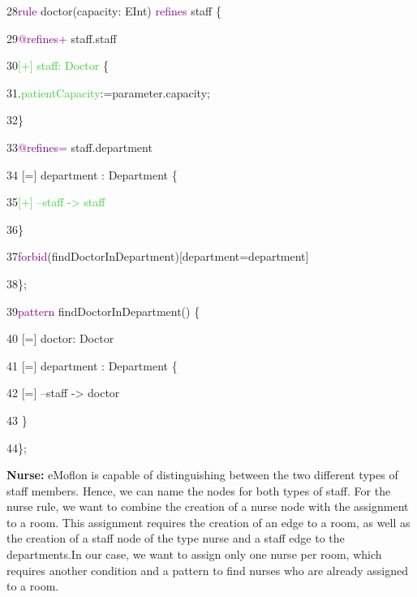 {

28\hspace{0.5cm}\textcolor{Purple}{rule} doctor(capacity: EInt) \textcolor{Purple}{refines} staff \{ 

29\hspace{1cm}\textcolor{Purple}{@refines+} staff.staff

30\hspace{1cm}\textcolor{LimeGreen}{[+] staff: Doctor} \{

31\hspace{1.5cm}.\textcolor{LimeGreen}{patientCapacity}:=parameter.capacity;

32\hspace{1cm}\}

33\hspace{1cm}\textcolor{Purple}{@refines=} staff.department

34\hspace{1cm}		[=] department : Department \{

35\hspace{1.5cm}\textcolor{LimeGreen}{[+] --staff -> staff}

36\hspace{1cm}\}

37\hspace{0.5cm}\textcolor{Purple}{forbid}(findDoctorInDepartment)[department=department] 

38\hspace{0.5cm}\}; \newline

39\hspace{0.5cm}\textcolor{Purple}{pattern} findDoctorInDepartment() \{

40\hspace{1cm}		[=] doctor: Doctor

41\hspace{1cm}		[=] department : Department \{

42\hspace{1.5cm}			[=] --staff -> doctor

43\hspace{1cm}  \}

44\hspace{0.5cm}\};\newline\newline

}
\clearpage

\textbf{Nurse:}\newline
eMoflon is capable of distinguishing between the two different types of staff members. Hence, we can name the nodes for both types of staff. \newline
For the nurse rule, we want to combine the creation of a nurse node with the assignment to a room. This assignment requires the creation of an edge to a room, as well as the creation of a staff node of the type nurse and a staff edge to the departments.\newline In our case, we want to assign only one nurse per room, which requires another condition and a pattern to find nurses who are already assigned to a room.\newline\newline

